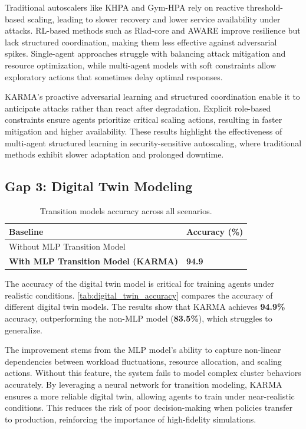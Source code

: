 Traditional autoscalers like KHPA and Gym-HPA rely on reactive threshold-based scaling, leading to slower recovery and lower service availability under attacks. RL-based methods such as Rlad-core and AWARE improve resilience but lack structured coordination, making them less effective against adversarial spikes. Single-agent approaches struggle with balancing attack mitigation and resource optimization, while multi-agent models with soft constraints allow exploratory actions that sometimes delay optimal responses.

KARMA's proactive adversarial learning and structured coordination enable it to anticipate attacks rather than react after degradation. Explicit role-based constraints ensure agents prioritize critical scaling actions, resulting in faster mitigation and higher availability. These results highlight the effectiveness of multi-agent structured learning in security-sensitive autoscaling, where traditional methods exhibit slower adaptation and prolonged downtime.


\subsection{Gap 3: Digital Twin Modeling}

\begin{table}[h]
  \centering
  \caption{Transition models accuracy across all scenarios.}
  \label{tab:digital_twin_accuracy}{
    \footnotesize
    \begin{tabular}{>{\raggedright\arraybackslash}m{6cm}>{\centering\arraybackslash}m{2cm}}
      \hline
      \textbf{Baseline}                          & \textbf{Accuracy (\%)} \\
      \hline
      Without MLP Transition Model               & 83.5                   \\
      \textbf{With MLP Transition Model (KARMA)} & \textbf{94.9}          \\
      \hline
    \end{tabular}}
\end{table}
%
The accuracy of the digital twin model is critical for training agents under realistic conditions.
\autoref{tab:digital_twin_accuracy} compares the accuracy of different digital twin models. The results show that KARMA achieves \textbf{94.9\%} accuracy, outperforming the non-MLP model (\textbf{83.5\%}), which struggles to generalize.

The improvement stems from the MLP model's ability to capture non-linear dependencies between workload fluctuations, resource allocation, and scaling actions. Without this feature, the system fails to model complex cluster behaviors accurately.
%
By leveraging a neural network for transition modeling, KARMA ensures a more reliable digital twin, allowing agents to train under near-realistic conditions. This reduces the risk of poor decision-making when policies transfer to production, reinforcing the importance of high-fidelity simulations.



